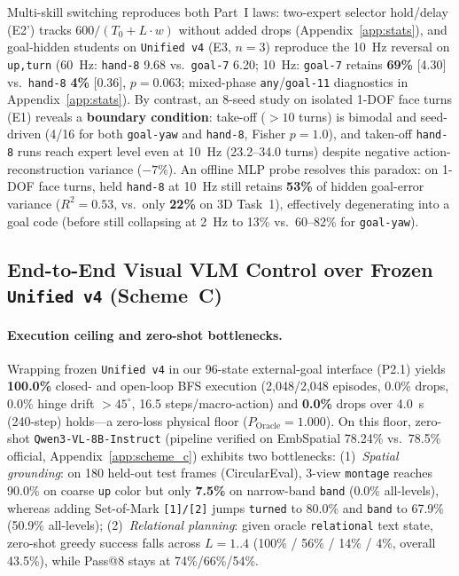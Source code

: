 Multi-skill switching reproduces both Part~I laws: two-expert selector hold/delay (E2') tracks $600/(T_0+L\cdot w)$ without added drops (Appendix~\ref{app:stats}), and goal-hidden students on \texttt{Unified v4} (E3, $n=3$) reproduce the 10~Hz reversal on \texttt{up,turn} (60~Hz: \texttt{hand-8} 9.68 vs.\ \texttt{goal-7} 6.20; 10~Hz: \texttt{goal-7} retains \textbf{69\%} [4.30] vs.\ \texttt{hand-8} \textbf{4\%} [0.36], $p=0.063$; mixed-phase \texttt{any}/\texttt{goal-11} diagnostics in Appendix~\ref{app:stats}).
By contrast, an 8-seed study on isolated 1-DOF face turns (E1) reveals a \textbf{boundary condition}: take-off ($>10$ turns) is bimodal and seed-driven (4/16 for both \texttt{goal-yaw} and \texttt{hand-8}, Fisher $p=1.0$), and taken-off \texttt{hand-8} runs reach expert level even at 10~Hz (23.2--34.0 turns) despite negative action-reconstruction variance ($-7\%$).
An offline MLP probe resolves this paradox: on 1-DOF face turns, held \texttt{hand-8} at 10~Hz still retains \textbf{53\%} of hidden goal-error variance ($R^2=0.53$, vs.\ only \textbf{22\%} on 3D Task~1), effectively degenerating into a goal code (before still collapsing at 2~Hz to 13\% vs.\ 60--82\% for \texttt{goal-yaw}).

\subsection{End-to-End Visual VLM Control over Frozen \texttt{Unified v4} (Scheme~C)}
\label{sec:exp_vlm}
\paragraph{Execution ceiling and zero-shot bottlenecks.}
Wrapping frozen \texttt{Unified v4} in our 96-state external-goal interface (P2.1) yields \textbf{100.0\%} closed- and open-loop BFS execution (2,048/2,048 episodes, 0.0\% drops, 0.0\% hinge drift $>45^\circ$, 16.5 steps/macro-action) and \textbf{0.0\%} drops over 4.0~s (240-step) holds—a zero-loss physical floor ($P_{\mathrm{Oracle}}=1.000$).
On this floor, zero-shot \texttt{Qwen3-VL-8B-Instruct} (pipeline verified on EmbSpatial 78.24\% vs.\ 78.5\% official, Appendix~\ref{app:scheme_c}) exhibits two bottlenecks:
(1)~\emph{Spatial grounding}: on 180 held-out test frames (CircularEval), 3-view \texttt{montage} reaches 90.0\% on coarse \texttt{up} color but only \textbf{7.5\%} on narrow-band \texttt{band} (0.0\% all-levels), whereas adding Set-of-Mark \texttt{[1]/[2]} jumps \texttt{turned} to 80.0\% and \texttt{band} to 67.9\% (50.9\% all-levels);
(2)~\emph{Relational planning}: given oracle \texttt{relational} text state, zero-shot greedy success falls across $L=1..4$ (100\% / 56\% / 14\% / 4\%, overall 43.5\%), while Pass@8 stays at 74\%/66\%/54\%.

